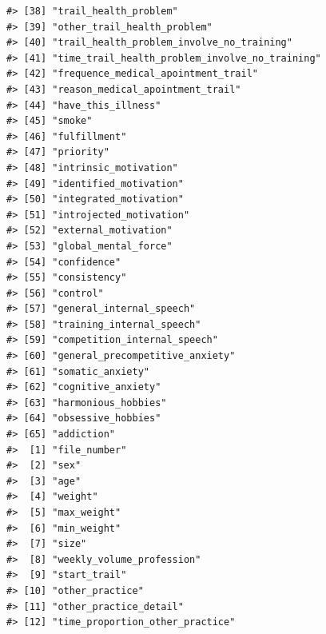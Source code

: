 \documentclass[
]{article}
\begin{document}
\begin{verbatim}
#> [38] "trail_health_problem"                                    
#> [39] "other_trail_health_problem"                              
#> [40] "trail_health_problem_involve_no_training"                
#> [41] "time_trail_health_problem_involve_no_training"           
#> [42] "frequence_medical_apointment_trail"                      
#> [43] "reason_medical_apointment_trail"                         
#> [44] "have_this_illness"                                       
#> [45] "smoke"                                                   
#> [46] "fulfillment"                                             
#> [47] "priority"                                                
#> [48] "intrinsic_motivation"                                    
#> [49] "identified_motivation"                                   
#> [50] "integrated_motivation"                                   
#> [51] "introjected_motivation"                                  
#> [52] "external_motivation"                                     
#> [53] "global_mental_force"                                     
#> [54] "confidence"                                              
#> [55] "consistency"                                             
#> [56] "control"                                                 
#> [57] "general_internal_speech"                                 
#> [58] "training_internal_speech"                                
#> [59] "competition_internal_speech"                             
#> [60] "general_precompetitive_anxiety"                          
#> [61] "somatic_anxiety"                                         
#> [62] "cognitive_anxiety"                                       
#> [63] "harmonious_hobbies"                                      
#> [64] "obsessive_hobbies"                                       
#> [65] "addiction"
#>  [1] "file_number"                                             
#>  [2] "sex"                                                     
#>  [3] "age"                                                     
#>  [4] "weight"                                                  
#>  [5] "max_weight"                                              
#>  [6] "min_weight"                                              
#>  [7] "size"                                                    
#>  [8] "weekly_volume_profession"                                
#>  [9] "start_trail"                                             
#> [10] "other_practice"                                          
#> [11] "other_practice_detail"                                   
#> [12] "time_proportion_other_practice"                          

\end{verbatim}
\end{document}
